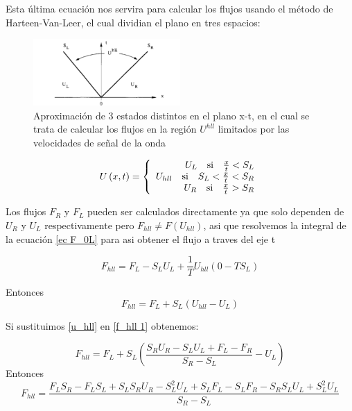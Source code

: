 \documentclass[12pt,a4paper]{book}
\begin{document}
Esta última ecuación nos servira para calcular los flujos usando el método de Harteen-Van-Leer, el cual dividian el plano en tres espacios:

\begin{figure} %
  \centering
    \includegraphics[width=0.5\textwidth]{Figuras/HLL.png}
  \caption{Aproximación de 3 estados distintos en el plano x-t, en el cual se trata de calcular los flujos en la región $U^{hll}$ limitados por las velocidades de señal de la onda}
  \label{fig:HLL}
\end{figure}

\begin{equation}
U \left(x,t \right) = 
\left\lbrace
\begin{array}{rr}
U_L \quad \textup{si} \quad \frac{x}{t}< S_L  \\
U_{hll} \quad \textup{si} \quad S_L< \frac{x}{t} <S_R \\
U_R \quad \textup{si} \quad  \frac{x}{t} > S_R
\end{array}
\right.
\end{equation}

Los flujos $F_R$ y $F_L$ pueden ser calculados directamente ya que solo dependen de $U_R$ y $U_L$ respectivamente pero $F_{hll} \neq F \left( U_{hll} \right)$, asi que resolvemos la integral de la ecuación \ref{ec F_0L} para asi obtener el flujo a traves del eje t

\begin{equation*}
F_{hll} = F_L -S_L U_L+ \frac{1}{T}U_{hll}\left(0- TS_L\right)
\end{equation*}

Entonces
\begin{equation}\label{f_hll 1}
F_{hll} = F_L +S_L \left( U_{hll} -U_L \right)
\end{equation}

Si sustituimos \ref{u_hll} en \ref{f_hll 1} obtenemos:

\begin{equation*}
F_{hll} = F_L +S_L \left( \frac{S_R U_R - S_L U_L + F_L - F_R}{S_R - S_L} -U_L \right)
\end{equation*}
Entonces
\begin{equation*}
F_{hll} = \frac{F_L S_R -F_L S_L+S_L S_R U_R-S_L^2 U_L+S_L  F_L- S_L F_R-S_R S_L U_L + S_L^2 U_L}{S_R-S_L}
\end{equation*}
\end{document}
